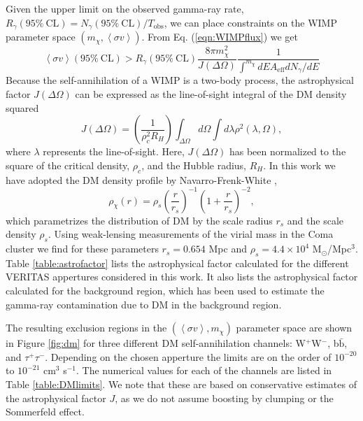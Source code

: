 \documentclass[12pt,manuscript]{aastex}
\newcommand{\expval}[1]{\left\langle #1 \right\rangle}
\begin{document}
Given the upper limit on the observed gamma-ray rate,
$R_{\gamma}(95\%\ \mathrm{CL}) = N_{\gamma}(95\%\ \mathrm{CL}) / T_{\mathrm{obs}}$, we can place
constraints on the WIMP parameter space $(m_{\chi}, \expval{\sigma v})$. From Eq.
(\ref{eqn:WIMPflux}) we get
\begin{equation}
\expval{\sigma v}(95\%\ \mathrm{CL}) > 
R_{\gamma}(95\%\ \mathrm{CL}) \frac{8\pi m_{\chi}^{2}}{J(\Delta\Omega)}
\frac{1}{\int^{m_{\chi}} dE A_{\mathrm{eff}}dN_{\gamma}/dE}
\end{equation}
Because the self-annihilation of a WIMP is a two-body process, the astrophysical factor
$J(\Delta\Omega)$ can be expressed as the line-of-sight integral of the DM density squared
\begin{equation}
J(\Delta\Omega)=\left(\frac{1}{\rho_{c}^{2}R_{H}}\right)
\int_{\Delta\Omega}d\Omega\int d\lambda \rho^{2}(\lambda,\Omega),
\end{equation}
where $\lambda$ represents the line-of-sight. Here,
$J(\Delta\Omega)$ has been normalized to the square of the critical density, $\rho_{c}$, and the
Hubble radius, $R_{H}$. In this work we have adopted the DM density profile by
Navarro-Frenk-White \citep[NFW;][]{article:NavarroFrenkWhite:1997},
\begin{equation}
\rho_{\chi}(r)=\rho_{s}\left(\frac{r}{r_{s}}\right)^{-1}\left(1+\frac{r}{r_{s}}\right)^{-2},
\end{equation} 
which parametrizes the distribution of DM by the scale radius $r_{s}$ and the scale density
$\rho_{s}$. Using weak-lensing measurements of the virial mass in the Coma cluster
\citep{article:Gavazzi_etal:2009} we find for these parameters $r_{s}=0.654$ Mpc and
$\rho_{s}=4.4\times 10^{4}$ M$_{\odot}$/Mpc$^{3}$. Table \ref{table:astrofactor} lists the
astrophysical factor calculated for the different VERITAS appertures considered in this work.
It also lists the astrophysical factor calculated for the background region, which has been used
to estimate the gamma-ray contamination due to DM in the background region.

The resulting exclusion regions in the $(\expval{\sigma v}, m_{\chi})$ parameter space are shown in
Figure \ref{fig:dm} for three different DM self-annihilation channels: W$^{+}$W$^{-}$,
b$\bar{\mathrm{b}}$, and $\tau^{+}\tau^{-}$. Depending on the chosen apperture the limits are on
the order of $10^{-20}$ to $10^{-21}$ cm$^{3}$ s$^{-1}$. The numerical values for each of the channels
are listed in Table \ref{table:DMlimits}. We note that these are based on conservative estimates of the
astrophysical factor $J$, as we do not assume boosting by clumping or the Sommerfeld effect.
\end{document}
